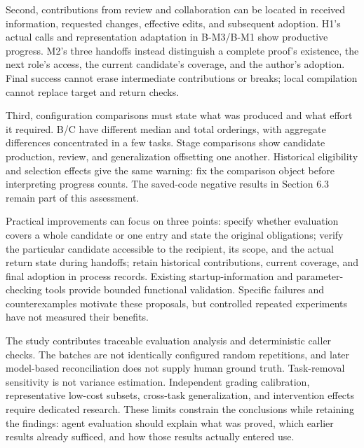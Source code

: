 Second, contributions from review and collaboration can be located in received information, requested changes, effective edits, and subsequent adoption. H1's actual calls and representation adaptation in B-M3/B-M1 show productive progress. M2's three handoffs instead distinguish a complete proof's existence, the next role's access, the current candidate's coverage, and the author's adoption. Final success cannot erase intermediate contributions or breaks; local compilation cannot replace target and return checks.

Third, configuration comparisons must state what was produced and what effort it required. B/C have different median and total orderings, with aggregate differences concentrated in a few tasks. Stage comparisons show candidate production, review, and generalization offsetting one another. Historical eligibility and selection effects give the same warning: fix the comparison object before interpreting progress counts. The saved-code negative results in Section 6.3 remain part of this assessment.

Practical improvements can focus on three points: specify whether evaluation covers a whole candidate or one entry and state the original obligations; verify the particular candidate accessible to the recipient, its scope, and the actual return state during handoffs; retain historical contributions, current coverage, and final adoption in process records. Existing startup-information and parameter-checking tools provide bounded functional validation. Specific failures and counterexamples motivate these proposals, but controlled repeated experiments have not measured their benefits.

The study contributes traceable evaluation analysis and deterministic caller checks. The batches are not identically configured random repetitions, and later model-based reconciliation does not supply human ground truth. Task-removal sensitivity is not variance estimation. Independent grading calibration, representative low-cost subsets, cross-task generalization, and intervention effects require dedicated research. These limits constrain the conclusions while retaining the findings: agent evaluation should explain what was proved, which earlier results already sufficed, and how those results actually entered use.

